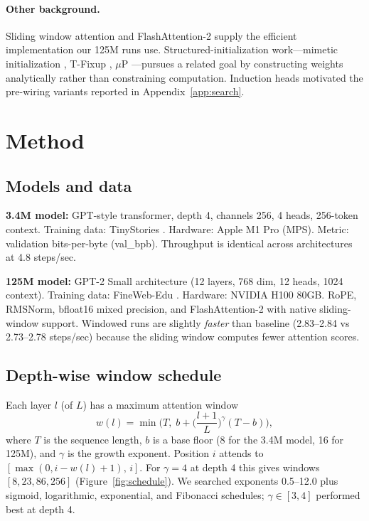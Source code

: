 \documentclass[11pt,a4paper]{article}
\begin{document}
\paragraph{Other background.} Sliding window attention \citep{beltagy2020longformer} and FlashAttention-2 \citep{dao2023flashattention2} supply the efficient implementation our 125M runs use. Structured-initialization work---mimetic initialization \citep{trockman2023mimetic}, T-Fixup \citep{huang2020tfixup}, $\mu$P \citep{yang2022mup}---pursues a related goal by constructing weights analytically rather than constraining computation. Induction heads \citep{olsson2022incontext} motivated the pre-wiring variants reported in Appendix~\ref{app:search}.

\section{Method}

\subsection{Models and data}

\textbf{3.4M model:} GPT-style transformer, depth 4, channels 256, 4 heads, 256-token context. Training data: TinyStories \citep{eldan2023tinystories}. Hardware: Apple M1 Pro (MPS). Metric: validation bits-per-byte (val\_bpb). Throughput is identical across architectures at 4.8 steps/sec.

\textbf{125M model:} GPT-2 Small architecture (12 layers, 768 dim, 12 heads, 1024 context). Training data: FineWeb-Edu \citep{penedo2024fineweb}. Hardware: NVIDIA H100 80GB. RoPE, RMSNorm, bfloat16 mixed precision, and FlashAttention-2 with native sliding-window support. Windowed runs are slightly \emph{faster} than baseline (2.83--2.84 vs 2.73--2.78 steps/sec) because the sliding window computes fewer attention scores.

\subsection{Depth-wise window schedule}

Each layer $l$ (of $L$) has a maximum attention window
\begin{equation}
    w(l) = \min\!\Big(T,\; b + \Big(\frac{l+1}{L}\Big)^{\!\gamma} (T - b)\Big),
    \label{eq:window}
\end{equation}
where $T$ is the sequence length, $b$ is a base floor (8 for the 3.4M model, 16 for 125M), and $\gamma$ is the growth exponent. Position $i$ attends to $[\max(0, i - w(l) + 1),\, i]$. For $\gamma = 4$ at depth 4 this gives windows $[8, 23, 86, 256]$ (Figure~\ref{fig:schedule}). We searched exponents 0.5--12.0 plus sigmoid, logarithmic, exponential, and Fibonacci schedules; $\gamma \in [3,4]$ performed best at depth 4.
\end{document}
